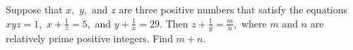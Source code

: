 Suppose that $x,$ $y,$ and $z$ are three positive numbers that satisfy the equations $xyz=1,$ $x+\frac{1}{z}=5,$ and $y+\frac{1}{x}=29.$ Then $z+\frac{1}{y}=\frac{m}{n},$ where $m$ and $n$ are relatively prime positive integers. Find $m+n.$